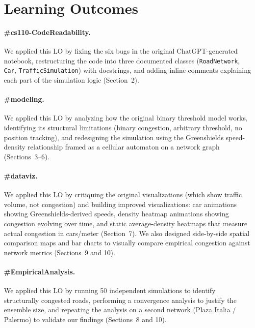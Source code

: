 \documentclass[12pt]{article}
\begin{document}
\section*{Learning Outcomes}

\paragraph{\#cs110-CodeReadability.}
We applied this LO by fixing the six bugs in the original ChatGPT-generated notebook, restructuring the code into three documented classes (\texttt{RoadNetwork}, \texttt{Car}, \texttt{TrafficSimulation}) with docstrings, and adding inline comments explaining each part of the simulation logic (Section~2).

\paragraph{\#modeling.}
We applied this LO by analyzing how the original binary threshold model works, identifying its structural limitations (binary congestion, arbitrary threshold, no position tracking), and redesigning the simulation using the Greenshields speed-density relationship framed as a cellular automaton on a network graph (Sections~3--6).

\paragraph{\#dataviz.}
We applied this LO by critiquing the original visualizations (which show traffic volume, not congestion) and building improved visualizations: car animations showing Greenshields-derived speeds, density heatmap animations showing congestion evolving over time, and static average-density heatmaps that measure actual congestion in cars/meter (Section~7). We also designed side-by-side spatial comparison maps and bar charts to visually compare empirical congestion against network metrics (Sections~9 and 10).

\paragraph{\#EmpiricalAnalysis.}
We applied this LO by running 50 independent simulations to identify structurally congested roads, performing a convergence analysis to justify the ensemble size, and repeating the analysis on a second network (Plaza Italia / Palermo) to validate our findings (Sections~8 and 10).
\end{document}

